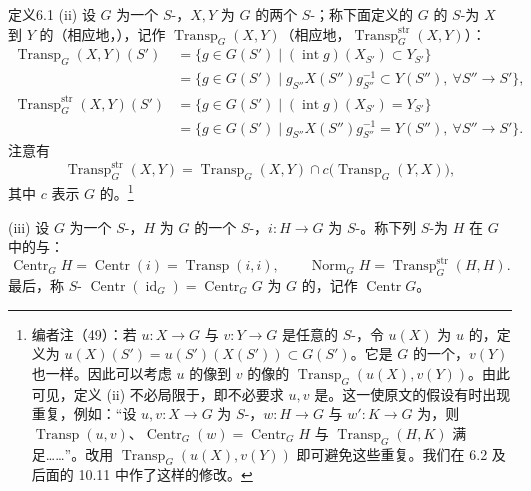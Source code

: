 \begin{SGAresult}{定义}{6.1}
(ii) 设 $G$ 为一个 $S$-，$X,Y$ 为 $G$ 的两个 $S$-；称下面定义的 $G$ 的 $S$-为 $X$ 到 $Y$ 的（相应地，），记作 $\operatorname{Transp}_G(X,Y)$（相应地，$\operatorname{Transp}^{\mathrm{str}}_G(X,Y)$）：
\[
\begin{aligned}
\operatorname{Transp}_G(X,Y)(S')
 &=\{g\in G(S')\mid(\operatorname{int}g)(X_{S'})\subset Y_{S'}\}\\
 &=\{g\in G(S')\mid g_{S''}X(S'')g_{S''}^{-1}\subset Y(S''),\ \forall S''\to S'\},\\
\operatorname{Transp}^{\mathrm{str}}_G(X,Y)(S')
 &=\{g\in G(S')\mid(\operatorname{int}g)(X_{S'})=Y_{S'}\}\\
 &=\{g\in G(S')\mid g_{S''}X(S'')g_{S''}^{-1}=Y(S''),\ \forall S''\to S'\}.
\end{aligned}
\]
注意有
\[
\operatorname{Transp}^{\mathrm{str}}_G(X,Y)
 =\operatorname{Transp}_G(X,Y)\cap c\bigl(\operatorname{Transp}_G(Y,X)\bigr),
\]
其中 $c$ 表示 $G$ 的。\footnote{编者注（49）：若 $u:X\to G$ 与 $v:Y\to G$ 是任意的 $S$-，令 $u(X)$ 为 $u$ 的，定义为 $u(X)(S')=u(S')(X(S'))\subset G(S')$。它是 $G$ 的一个，$v(Y)$ 也一样。因此可以考虑 $u$ 的像到 $v$ 的像的 $\operatorname{Transp}_G(u(X),v(Y))$。由此可见，定义 (ii) 不必局限于，即不必要求 $u,v$ 是。这一使原文的假设有时出现重复，例如：“设 $u,v:X\to G$ 为 $S$-，$w:H\to G$ 与 $w':K\to G$ 为，则 $\operatorname{Transp}(u,v)$、$\operatorname{Centr}_G(w)=\operatorname{Centr}_G H$ 与 $\operatorname{Transp}_G(H,K)$ 满足……”。改用 $\operatorname{Transp}_G(u(X),v(Y))$ 即可避免这些重复。我们在 6.2 及后面的 10.11 中作了这样的修改。}

(iii) 设 $G$ 为一个 $S$-，$H$ 为 $G$ 的一个 $S$-，$i:H\to G$ 为 $S$-。称下列 $S$-为 $H$ 在 $G$ 中的与：
\[
\operatorname{Centr}_G H=\operatorname{Centr}(i)=\operatorname{Transp}(i,i),
\qquad \operatorname{Norm}_G H=\operatorname{Transp}^{\mathrm{str}}_G(H,H).
\]
最后，称 $S$- $\operatorname{Centr}(\operatorname{id}_G)=\operatorname{Centr}_G G$ 为 $G$ 的，记作 $\operatorname{Centr}G$。
\end{SGAresult}

